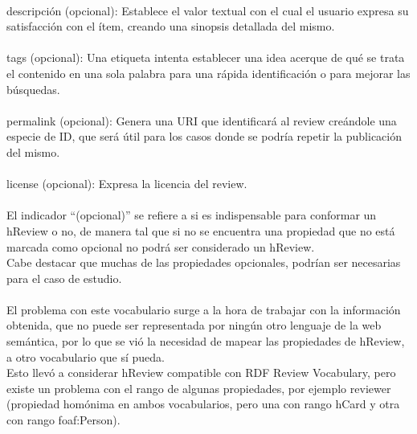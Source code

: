 \\
descripción (opcional): Establece el valor textual con el cual el usuario expresa su satisfacción con el ítem, creando una 
sinopsis detallada del mismo. \\
\\
tags (opcional): Una etiqueta intenta establecer una idea acerque de qué se trata el contenido en una sola palabra para una rápida identificación 
o para mejorar las búsquedas. \\
\\
permalink (opcional): Genera una URI que identificará al review creándole una especie de ID, que será útil para los casos donde 
se podría repetir la publicación del mismo. \\
\\
license (opcional): Expresa la licencia del review.\\
\\
El indicador ``(opcional)'' se refiere a si es indispensable para conformar un hReview o no, de manera tal que si no se encuentra una 
propiedad que no está marcada como opcional no podrá ser considerado un hReview.\\
Cabe destacar que muchas de las propiedades opcionales, podrían ser necesarias para el caso de estudio.\\
\\
El problema con este vocabulario surge a la hora de trabajar con la información obtenida, que no puede ser representada por ningún otro 
lenguaje de la web semántica, por lo que se vió la necesidad de mapear las propiedades de hReview, a otro vocabulario que sí pueda.\\
Esto llevó a considerar hReview compatible con RDF Review Vocabulary, pero existe un problema con el rango de algunas propiedades,  
por ejemplo reviewer (propiedad homónima en ambos vocabularios, pero una con rango hCard y otra con rango foaf:Person).\\
\\